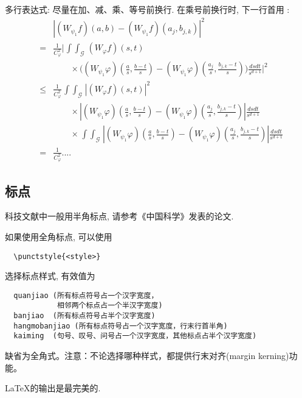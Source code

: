多行表达式: 尽量在加、减、乘、等号前换行. 在乘号前换行时,
下一行首用 \string\times:
\def\iint{\mathop{\int\!\!\!\int}}\def\calG{\mathcal G}
\begin{eqnarray}
&&\left|(W_{\psi_1}f)(a,b)-(W_{\psi_1}f)(a_j,b_{j,k})\right|^{2}\nonumber\\
&=&\frac{1}{C^{2}_{\varphi}}\Bigg|\iint_{\calG} (W_{\varphi}f)(s,t) \nonumber\\
&&\qquad\times \Bigg( (W_{\psi_1}\varphi)\left(\frac{a}{s},
\frac{b-t}{s}\right)
     -(W_{\psi_1}\varphi)\left(\frac{a_{j}}{s}, \frac{b_{j,k}-t}{s}\right)\Bigg)
  \frac{dsdt}{s^{d+1}}\Bigg|^2 \nonumber\\
&\le& \frac{1}{C^2_{\varphi}} \iint_{\calG} |(W_{\varphi}f)(s,t)|^2 \nonumber\\
&&\qquad \times\left| (W_{\psi_1}\varphi)\left(\frac{a}{s},
\frac{b-t}{s}\right)
    -(W_{\psi_1}\varphi)\left(\frac{a_{j}}{s}, \frac{b_{j,k}-t}{s}\right)\right|
   \frac{dsdt}{s^{d+1}}  \nonumber\\
&&\qquad \times   \iint_{\calG}\!
 \left|(W_{\psi_1}\varphi)\left(\frac{a}{s}, \frac{b-t}{s}\right)
    -(W_{\psi_1}\varphi)\left(\frac{a_{j}}{s}, \frac{b_{j,k}-t}{s}\right)\right|
 \frac{ ds dt}{s^{d+1}} \nonumber\\
&=& \frac{1}{C^2_{\varphi}} ....  \label{eq:a0}
\end{eqnarray}


\subsection{标点}
科技文献中一般用半角标点, 请参考《中国科学》发表的论文.

如果使用全角标点, 可以使用
\begin{verbatim}
  \punctstyle{<style>}
\end{verbatim}
选择标点样式, 有效值为
\begin{verbatim}
  quanjiao (所有标点符号占一个汉字宽度，
            相邻两个标点占一个半汉字宽度)
  banjiao  (所有标点符号占半个汉字宽度)
  hangmobanjiao (所有标点符号占一个汉字宽度，行末行首半角)
  kaiming  (句号、叹号、问号占一个汉字宽度，其他标点占半个汉字宽度)
\end{verbatim}
缺省为全角式。注意：不论选择哪种样式，都提供行末对齐(margin kerning)功能。



\begin{Theorem} \label{thm:latex}
\LaTeX 的输出是最完美的.
\end{Theorem}

